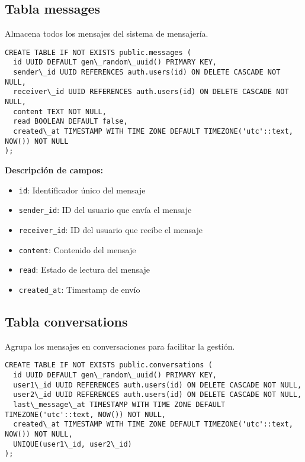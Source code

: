 \documentclass[12pt,a4paper]{article}
\begin{document}
\subsection{Tabla messages}

Almacena todos los mensajes del sistema de mensajería.

\begin{lstlisting}[caption=Estructura completa de messages]
CREATE TABLE IF NOT EXISTS public.messages (
  id UUID DEFAULT gen\_random\_uuid() PRIMARY KEY,
  sender\_id UUID REFERENCES auth.users(id) ON DELETE CASCADE NOT NULL,
  receiver\_id UUID REFERENCES auth.users(id) ON DELETE CASCADE NOT NULL,
  content TEXT NOT NULL,
  read BOOLEAN DEFAULT false,
  created\_at TIMESTAMP WITH TIME ZONE DEFAULT TIMEZONE('utc'::text, NOW()) NOT NULL
);
\end{lstlisting}

\textbf{Descripción de campos:}
\begin{itemize}
    \item \texttt{id}: Identificador único del mensaje
    \item \texttt{sender\_id}: ID del usuario que envía el mensaje
    \item \texttt{receiver\_id}: ID del usuario que recibe el mensaje
    \item \texttt{content}: Contenido del mensaje
    \item \texttt{read}: Estado de lectura del mensaje
    \item \texttt{created\_at}: Timestamp de envío
\end{itemize}

\subsection{Tabla conversations}

Agrupa los mensajes en conversaciones para facilitar la gestión.

\begin{lstlisting}[caption=Estructura completa de conversations]
CREATE TABLE IF NOT EXISTS public.conversations (
  id UUID DEFAULT gen\_random\_uuid() PRIMARY KEY,
  user1\_id UUID REFERENCES auth.users(id) ON DELETE CASCADE NOT NULL,
  user2\_id UUID REFERENCES auth.users(id) ON DELETE CASCADE NOT NULL,
  last\_message\_at TIMESTAMP WITH TIME ZONE DEFAULT TIMEZONE('utc'::text, NOW()) NOT NULL,
  created\_at TIMESTAMP WITH TIME ZONE DEFAULT TIMEZONE('utc'::text, NOW()) NOT NULL,
  UNIQUE(user1\_id, user2\_id)
);
\end{lstlisting}
\end{document}
